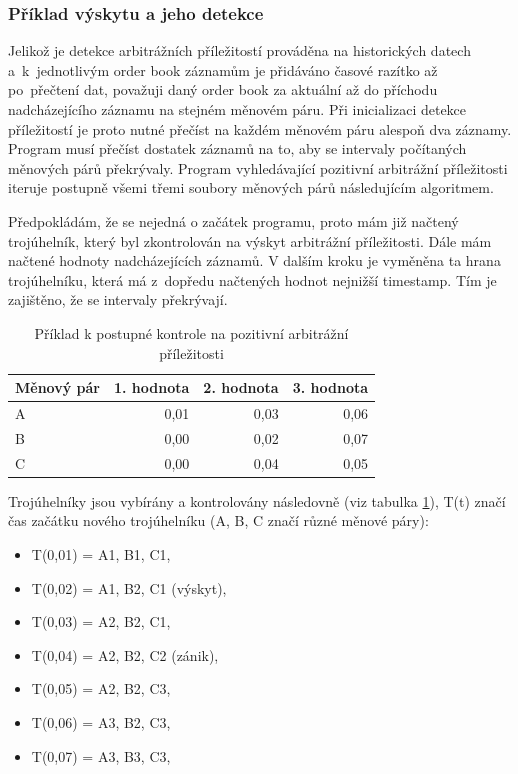 \documentclass[thesis=B,czech]{FITthesis}[2019/03/21]
\begin{document}
\subsubsection{Příklad výskytu a jeho detekce}
Jelikož je detekce arbitrážních příležitostí prováděna na historických datech a~k~jednotlivým order book záznamům je přidáváno časové razítko až po~přečtení dat, považuji daný order book za aktuální až do příchodu nadcházejícího záznamu na stejném měnovém páru. Při inicializaci detekce příležitostí je proto nutné přečíst na každém měnovém páru alespoň dva záznamy. Program musí přečíst dostatek záznamů na to, aby se intervaly počítaných měnových párů překrývaly. Program vyhledávající pozitivní arbitrážní příležitosti iteruje postupně všemi třemi soubory měnových párů následujícím algoritmem. 

Předpokládám, že se nejedná o začátek programu, proto mám již načtený trojúhelník, který byl zkontrolován na výskyt arbitrážní příležitosti. Dále mám načtené hodnoty nadcházejících záznamů. V dalším kroku je vyměněna ta hrana trojúhelníku, která má z~dopředu načtených hodnot nejnižší timestamp. Tím je zajištěno, že se intervaly překrývají. 

\begin{table}\centering
\caption{Příklad k postupné kontrole na pozitivní arbitrážní příležitosti}
\label{timestamp_example}
\begin{tabular}{|| l | r | r | r ||}\hline Měnový pár & 1. hodnota & 2. hodnota & 3. hodnota\\ [0.5ex]
 \hline
 \hline A & 0,01 & 0,03 & 0,06\\ 
 \hline B & 0,00 & 0,02 & 0,07\\ 
 \hline C & 0,00 & 0,04 & 0,05\\ 
 \hline
\end{tabular}
\end{table}

Trojúhelníky jsou vybírány a kontrolovány následovně (viz tabulka \ref{timestamp_example}), T(t) značí čas začátku nového trojúhelníku (A, B, C značí různé měnové páry):
\begin{itemize}
    \item T(0,01) = A1, B1, C1,
    \item T(0,02) = A1, B2, C1 (výskyt),
    \item T(0,03) = A2, B2, C1,
    \item T(0,04) = A2, B2, C2 (zánik),
    \item T(0,05) = A2, B2, C3,
    \item T(0,06) = A3, B2, C3,
    \item T(0,07) = A3, B3, C3,
\end{itemize}
\end{document}
